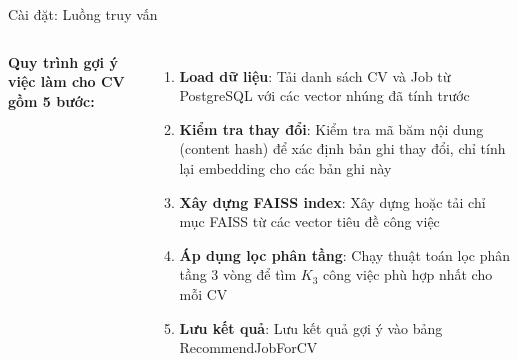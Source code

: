 \documentclass[aspectratio=169,xcolor=dvipsnames, t]{beamer}
\begin{document}

\begin{frame}{Cài đặt: Luồng truy vấn}
\begin{columns}[T]
\justifying
\small

\textbf{Quy trình gợi ý việc làm cho CV gồm 5 bước:}

\vspace{0.3cm}
\begin{enumerate}
    \item \textbf{Load dữ liệu}: Tải danh sách CV và Job từ PostgreSQL với các vector nhúng đã tính trước
    
    \item \textbf{Kiểm tra thay đổi}: Kiểm tra mã băm nội dung (content hash) để xác định bản ghi thay đổi, chỉ tính lại embedding cho các bản ghi này
    
    \item \textbf{Xây dựng FAISS index}: Xây dựng hoặc tải chỉ mục FAISS từ các vector tiêu đề công việc
    
    \item \textbf{Áp dụng lọc phân tầng}: Chạy thuật toán lọc phân tầng 3 vòng để tìm $K_3$ công việc phù hợp nhất cho mỗi CV
    
    \item \textbf{Lưu kết quả}: Lưu kết quả gợi ý vào bảng RecommendJobForCV
\end{enumerate}






\end{columns}
\end{frame}
\end{document}
